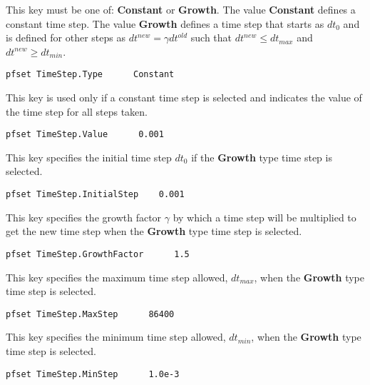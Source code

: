 {
This key must be one of: {\bf Constant} or {\bf Growth}.  The value
{\bf Constant} defines a constant time step.  The value {\bf Growth}
defines a time step that starts as $dt_0$ and is defined for
other steps as $dt^{new} = \gamma dt^{old}$ such that $dt^{new} \leq 
dt_{max}$ and $dt^{new} \geq dt_{min}$.
}
\begin{display}\begin{verbatim}
pfset TimeStep.Type      Constant
\end{verbatim}\end{display}

{
This key is used only if a constant time step is selected and indicates
the value of the time step for all steps taken.
}
\begin{display}\begin{verbatim}
pfset TimeStep.Value      0.001
\end{verbatim}\end{display}

{
This key specifies the initial time step $dt_0$ if the {\bf Growth} type time
step is selected. 
}
\begin{display}\begin{verbatim}
pfset TimeStep.InitialStep    0.001
\end{verbatim}\end{display}

{
This key specifies the growth factor $\gamma$ by which a time step will be
multiplied to get the new time step when the {\bf Growth} type time step is
selected. 
}
\begin{display}\begin{verbatim}
pfset TimeStep.GrowthFactor      1.5
\end{verbatim}\end{display}

{
This key specifies the maximum time step allowed, $dt_{max}$, when the {\bf
Growth} type time step is selected.
}
\begin{display}\begin{verbatim}
pfset TimeStep.MaxStep      86400
\end{verbatim}\end{display}

{
This key specifies the minimum time step allowed, $dt_{min}$, when the {\bf
Growth} type time step is selected.
}
\begin{display}\begin{verbatim}
pfset TimeStep.MinStep      1.0e-3
\end{verbatim}\end{display}

